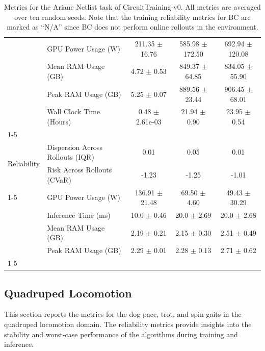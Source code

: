 \begin{table}[H]
{\begin{tabular}{|l|l|c|c|c|}
 & GPU Power Usage (W) & 211.35 $\pm$ 16.76 & 585.98 $\pm$ 172.50 & 692.94 $\pm$ 120.08 \\
 & Mean RAM Usage (GB) & 4.72 $\pm$ 0.53 & 849.37 $\pm$ 64.85 & 834.05 $\pm$ 55.90 \\
 & Peak RAM Usage (GB) & 5.25 $\pm$ 0.07 & 889.56 $\pm$ 23.44 & 906.45 $\pm$ 68.01 \\
 & Wall Clock Time (Hours) & 0.48 $\pm$ 2.61e-03 & 21.94 $\pm$ 0.90 & 23.95 $\pm$ 0.54 \\
\cline{1-5}
\midrule
\multicolumn{5}{|c|}{\textbf{Ariane (Inference)}} \\
\multirow[t]{2}{*}{Reliability} & Dispersion Across Rollouts (IQR) & 0.01 & 0.05 & 0.01 \\
 & Risk Across Rollouts (CVaR) & -1.23 & -1.25 & -1.01 \\
\cline{1-5}
\multirow[t]{4}{*}{System} & GPU Power Usage (W) & 136.91 $\pm$ 21.48 & 69.50 $\pm$ 4.60 & 49.43 $\pm$ 30.29 \\
 & Inference Time (ms) & 10.0 $\pm$ 0.46 & 20.0 $\pm$ 2.69 & 20.0 $\pm$ 2.68 \\
 & Mean RAM Usage (GB) & 2.19 $\pm$ 0.21 & 2.15 $\pm$ 0.30 & 2.51 $\pm$ 0.49 \\
 & Peak RAM Usage (GB) & 2.29 $\pm$ 0.01 & 2.28 $\pm$ 0.13 & 2.71 $\pm$ 0.62 \\
\cline{1-5}
\bottomrule
\end{tabular}
}
\caption{Metrics for the Ariane Netlist task of CircuitTraining-v0. All metrics are averaged over ten random seeds. Note that the training reliability metrics for BC are marked as ``N/A'' since BC does not perform online rollouts in the environment.}
\label{tab:appendix_metrics_circuit_training_ariane}
\end{table}




\subsection{Quadruped Locomotion}
\label{appendix:quadruped_locomotion}

This section reports the metrics for the dog pace, trot, and spin gaits in the quadruped locomotion domain. The reliability metrics provide insights into the stability and worst-case performance of the algorithms during training and inference.


